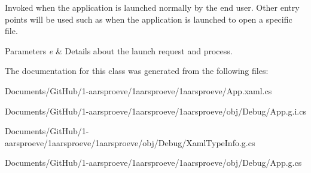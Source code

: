 Invoked when the application is launched normally by the end user. Other entry points will be used such as when the application is launched to open a specific file. 


\begin{DoxyParams}{Parameters}
{\em e} & Details about the launch request and process.\\
\hline
\end{DoxyParams}


The documentation for this class was generated from the following files\+:\begin{DoxyCompactItemize}
\item 
Documents/\+Git\+Hub/1-\/aarsproeve/1aarsproeve/1aarsproeve/App.\+xaml.\+cs\item 
Documents/\+Git\+Hub/1-\/aarsproeve/1aarsproeve/1aarsproeve/obj/\+Debug/App.\+g.\+i.\+cs\item 
Documents/\+Git\+Hub/1-\/aarsproeve/1aarsproeve/1aarsproeve/obj/\+Debug/Xaml\+Type\+Info.\+g.\+cs\item 
Documents/\+Git\+Hub/1-\/aarsproeve/1aarsproeve/1aarsproeve/obj/\+Debug/App.\+g.\+cs\end{DoxyCompactItemize}
